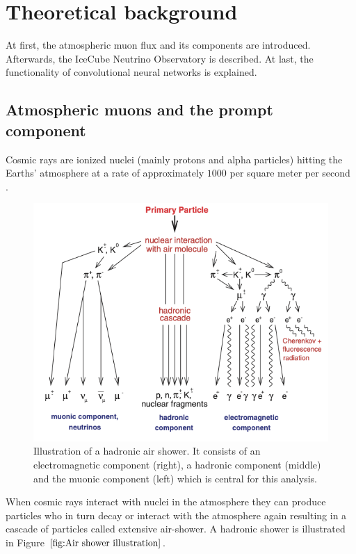 \documentclass[
  tucolor,       %
  BCOR=12mm,     %
  parskip=half,  %
  open=any,      %
  cleardoublepage=plain,  %
]{tudothesis}
\begin{document}
\chapter{Theoretical background}
At first, the atmospheric muon flux and its components are introduced. Afterwards, the IceCube Neutrino Observatory is described.
At last, the functionality of convolutional neural networks is explained.
\section{Atmospheric muons and the prompt component}
Cosmic rays are ionized nuclei (mainly protons and alpha particles) hitting the Earths' atmosphere at a rate of approximately $1000$ per square meter per second \cite{gaisser_engel_resconi_2016}.
\begin{figure}
  \centering
  \includegraphics[scale=0.3]{Plots/Air shower illustration}
  \caption{Illustration of a hadronic air shower. It consists of an electromagnetic component (right), a hadronic component (middle) and the muonic component (left) which is central for this analysis. \cite{Haungs}}
  \label{fig:Air shower illustration}
\end{figure}
When cosmic rays interact with nuclei in the atmosphere they can produce particles who in turn decay or interact with the atmosphere again resulting in a cascade of particles called extensive air-shower. A hadronic shower is illustrated in Figure $\ref{fig:Air shower illustration}$.
\end{document}

